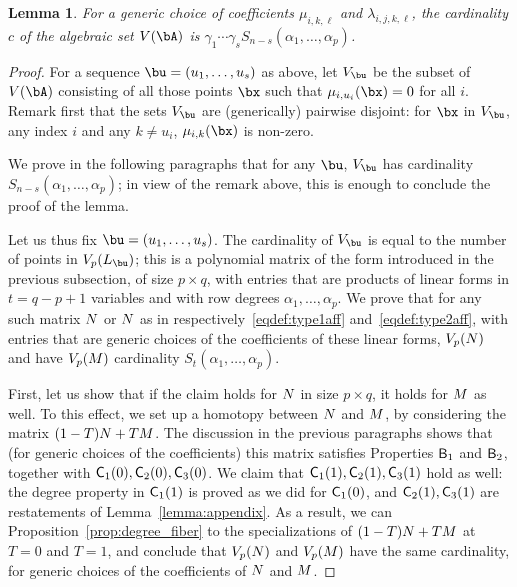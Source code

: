 \documentclass[12pt]{article}
\newtheorem{lemma}[definition]{Lemma}
\begin{document}
\begin{lemma}
  For a generic choice of coefficients $\mu_{i,k,\ell}$ and
  $\lambda_{i,j,k,\ell}$, the cardinality $c$ of the algebraic set
  $V(\bA)$ is $\gamma_1 \cdots \gamma_s
  S_{n-s}(\alpha_1,\dots,\alpha_p)$.
\end{lemma}
\begin{proof}
  For a sequence $\bu=(u_1,\dots,u_s)$ as above, let $V_\bu$ be the
  subset of $V(\bA)$ consisting of all those points $\bx$ such that
  $\mu_{i,u_i}(\bx)=0$ for all $i$. Remark first that the sets $V_\bu$
  are (generically) pairwise disjoint: for $\bx$ in $V_\bu$, any index
  $i$ and any $k \ne u_i$, $\mu_{i,k}(\bx)$ is non-zero.
  
  We prove in the following paragraphs that for any $\bu$, $V_\bu$ has
  cardinality $S_{n-s}(\alpha_1,\dots,\alpha_p)$; in view of the
  remark above, this is enough to conclude the proof of the lemma.

  Let us thus fix $\bu=(u_1,\dots,u_s)$. The cardinality of $V_\bu$ is
  equal to the number of points in $V_p(\mL_\bu)$; this is a
  polynomial matrix of the form introduced in the previous subsection,
  of size $p \times q$, with entries that are products of linear forms
  in $t=q-p+1$ variables and with row degrees
  $\alpha_1,\dots,\alpha_p$.  We prove that for any such matrix ${N}$
  or ${N}$ as in respectively~\eqref{eqdef:type1aff}
  and~\eqref{eqdef:type2aff}, with entries that are generic choices of
  the coefficients of these linear forms, $V_p({N})$ and have
  $V_p({M})$ cardinality $S_{t}(\alpha_1,\dots,\alpha_p)$.
  
  First, let us show that if the claim holds for ${N}$ in size $p
  \times q$, it holds for ${M}$ as well. To this effect, we set up a
  homotopy between ${N}$ and ${M}$, by considering the matrix
  $(1-T){N} + T{M}$.  The discussion in the previous paragraphs shows
  that (for generic choices of the coefficients) this matrix satisfies
  Properties $\mathsf{B}_1$ and $\mathsf{B}_2$, together with
  $\mathsf{C}_1(0),\mathsf{C}_2(0),\mathsf{C}_3(0)$.  We claim that
  $\mathsf{C}_1(1),\mathsf{C}_2(1),\mathsf{C}_3(1)$ hold as well: the degree property
  in $\mathsf{C}_1(1)$ is proved as we did for $\mathsf{C}_1(0)$, and
  $\mathsf{C}_2(1),\mathsf{C}_3(1)$ are restatements of
  Lemma~\ref{lemma:appendix}. As a result, we can
  Proposition~\ref{prop:degree_fiber} to the specializations of
  $(1-T){N} + T{M}$ at $T=0$ and $T=1$, and conclude that $V_p({N})$
  and $V_p({M})$ have the same cardinality, for generic choices of
  the coefficients of ${N}$ and ${M}$.


\end{proof}
\end{document}
